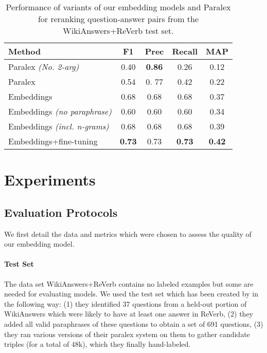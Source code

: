 \documentclass[runningheads,a4paper]{llncs}
\newcommand{\rv}{{\sc ReVerb}\xspace}
\newcommand{\wk}{{\sc WikiAnswers}\xspace}
\newcommand{\wkrv}{{\sc WikiAnswers+ReVerb}\xspace}
\begin{document}
\begin{table}
\caption{Performance of variants of our embedding models and Paralex \cite{paralex} for reranking question-answer pairs from the \wkrv test set.}
\label{tab:res}
\vskip -0.1in
\begin{center}
\begin{tabular}{|l|ccc|c|}
\hline
{\bf Method} & {\bf F1} & {\bf Prec} & {\bf Recall} & {\bf MAP}\\
\hline
Paralex {\it (No. 2-arg)} & 0.40   & {\bf 0.86} & 0.26 & 0.12 \\
Paralex &   0.54 &  0. 77 & 0.42 & 0.22 \\
\hline
Embeddings & 0.68 & 0.68  & 0.68  & 0.37\\
Embeddings {\it (no paraphrase)} & 0.60 & 0.60  & 0.60  & 0.34\\
Embeddings {\it (incl. n-grams)} & 0.68 & 0.68  & 0.68  & 0.39\\
Embeddings+fine-tuning & {\bf 0.73} & 0.73  & {\bf 0.73}  & {\bf 0.42} \\
\hline
\end{tabular}
\end{center}
\end{table}

\section{Experiments}
\label{sec:exp}


\subsection{Evaluation Protocols}

We first detail the data and metrics which were chosen to assess the quality of our embedding model.

\paragraph{Test Set} The data set \wkrv contains no labeled examples but some are needed for evaluating models.
We used the test set which has been created by \cite{paralex} in the following way: (1) they identified 37 questions from a held-out portion of \wk which were likely to have at least one answer in \rv, (2) they added all valid paraphrases of these questions to obtain a set of 691 questions, (3) they ran various versions of their {\sc paralex} system on them to gather candidate triples (for a total of 48k), which they finally hand-labeled.
\end{document}
